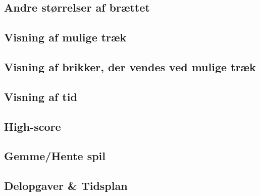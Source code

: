 \documentclass[a4paper, danish]{article}
\numberwithin{equation}{section}
\begin{document}
\subsection{Andre størrelser af brættet}
\subsection{Visning af mulige træk}
\subsection{Visning af brikker, der vendes ved mulige træk}
\subsection{Visning af tid}
\subsection{High-score}
\subsection{Gemme/Hente spil}
\newpage
\subsection{Delopgaver \& Tidsplan}
\end{document}
